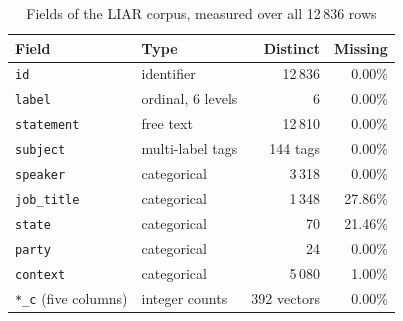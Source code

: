 \begin{table}[t]
\caption{Fields of the LIAR corpus, measured over all 12\,836 rows}
\label{tab:fields}
\centering
\footnotesize
\begin{tabular}{@{}llrr@{}}
\toprule
Field & Type & Distinct & Missing \\
\midrule
\texttt{id}            & identifier   & 12\,836 & 0.00\% \\
\texttt{label}         & ordinal, 6 levels & 6  & 0.00\% \\
\texttt{statement}     & free text    & 12\,810 & 0.00\% \\
\texttt{subject}       & multi-label tags & 144 tags & 0.00\% \\
\texttt{speaker}       & categorical  & 3\,318 & 0.00\% \\
\texttt{job\_title}    & categorical  & 1\,348 & 27.86\% \\
\texttt{state}         & categorical  & 70     & 21.46\% \\
\texttt{party}         & categorical  & 24     & 0.00\% \\
\texttt{context}       & categorical  & 5\,080 & 1.00\% \\
\texttt{*\_c} (five columns) & integer counts & 392 vectors & 0.00\% \\
\bottomrule
\end{tabular}
\end{table}
